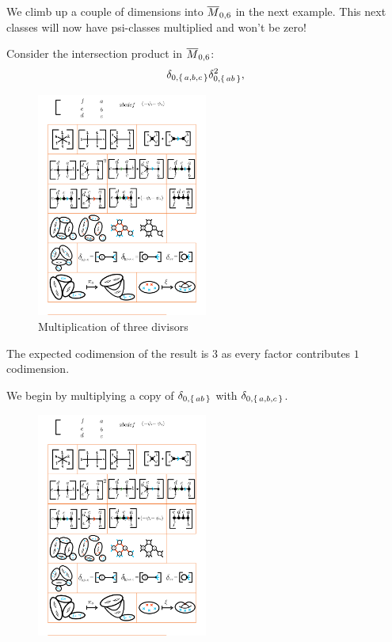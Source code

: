 \documentclass[12pt]{memoir}
\begin{document}
We climb up a couple of dimensions into $\overline M_{0,6}$ in the next example. This next classes will now have psi-classes multiplied and won't be zero!

\begin{Ex}
    Consider the intersection product in $\overline{M}_{0,6}$:
    $$\delta_{0,\{\,a,b,c\,\}}\delta_{0,\{\,ab\,\}}^2,$$
    \begin{figure}[h!]
        \centering
        \includegraphics[width=0.5\textwidth, trim= 1.3cm 17.2cm 12.8cm 8cm,clip]{../figs/FigsDNnotability1.pdf}
        \caption{Multiplication of three divisors}
        \label{fig:three-divisors-1-M06}
    \end{figure}
    The expected codimension of the result is $3$ as every factor contributes $1$ codimension.\par
    We begin by multiplying a copy of $\delta_{0,\{\,ab\,\}}$ with $\delta_{0,\{\,a,b,c\,\}}$.
    \begin{figure}[h!]
        \centering
        \includegraphics[width=0.5\textwidth, trim= 9cm 17.2cm 5.2cm 8cm,clip]{../figs/FigsDNnotability1.pdf}

\end{figure}
\end{Ex}
\end{document}
